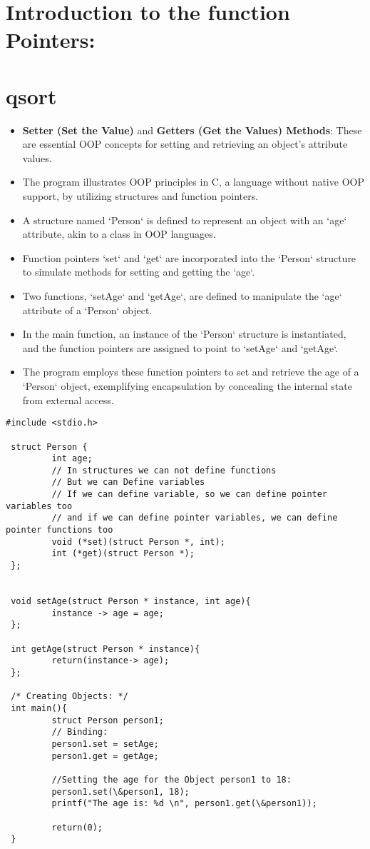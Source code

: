 \section{Introduction to the function Pointers:}


\section{qsort}
\begin{itemize}
    \item \textbf{Setter (Set the Value)} and \textbf{Getters (Get the Values) Methods}: These are essential OOP concepts for setting and retrieving an object's attribute values.
    \item The program illustrates OOP principles in C, a language without native OOP support, by utilizing structures and function pointers.
    \item A structure named `Person` is defined to represent an object with an `age` attribute, akin to a class in OOP languages.
    \item Function pointers `set` and `get` are incorporated into the `Person` structure to simulate methods for setting and getting the `age`.
    \item Two functions, `setAge` and `getAge`, are defined to manipulate the `age` attribute of a `Person` object.
    \item In the main function, an instance of the `Person` structure is instantiated, and the function pointers are assigned to point to `setAge` and `getAge`.
    \item The program employs these function pointers to set and retrieve the age of a `Person` object, exemplifying encapsulation by concealing the internal state from external access.
\end{itemize}
\break

\begin{lstlisting}
#include <stdio.h>

 struct Person {
         int age;
         // In structures we can not define functions
         // But we can Define variables
         // If we can define variable, so we can define pointer variables too
         // and if we can define pointer variables, we can define pointer functions too
         void (*set)(struct Person *, int);
         int (*get)(struct Person *);
 };


 void setAge(struct Person * instance, int age){
         instance -> age = age;
 };

 int getAge(struct Person * instance){
         return(instance-> age);
 };

 /* Creating Objects: */
 int main(){
         struct Person person1;
         // Binding:
         person1.set = setAge;
         person1.get = getAge;

         //Setting the age for the Object person1 to 18:
         person1.set(\&person1, 18);
         printf("The age is: %d \n", person1.get(\&person1));

         return(0);
 }

\end{lstlisting}
